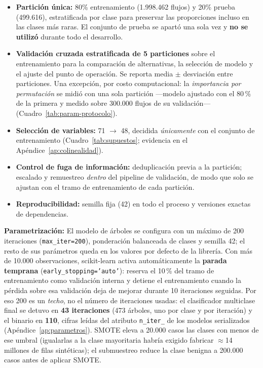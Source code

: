 \documentclass[11pt,a4paper]{article}
\begin{document}
\begin{itemize}
\item \textbf{Partición única:} 80\% entrenamiento (1.998.462 flujos) y 20\%
prueba (499.616), estratificada por clase para preservar las proporciones
incluso en las clases más raras. El conjunto de prueba se apartó una sola vez
y \textbf{no se utilizó} durante todo el desarrollo.
\item \textbf{Validación cruzada estratificada de 5 particiones} sobre el
entrenamiento para la comparación de alternativas, la selección de modelo y
el ajuste del punto de operación. Se reporta media $\pm$ desviación entre
particiones. Una excepción, por costo computacional: la \emph{importancia por
permutación} se midió con una sola partición ---modelo ajustado con el
80\,\% de la primera y medido sobre 300.000 flujos de su validación---
(Cuadro~\ref{tab:param-protocolo}).
\item \textbf{Selección de variables:} 71 $\rightarrow$ 48, decidida
\emph{únicamente} con el conjunto de entrenamiento (Cuadro~\ref{tab:supuestos}; evidencia en el Apéndice~\ref{ap:colinealidad}).
\item \textbf{Control de fuga de información:} deduplicación previa a la
partición; escalado y remuestreo \emph{dentro} del pipeline de validación, de
modo que solo se ajustan con el tramo de entrenamiento de cada partición.
\item \textbf{Reproducibilidad:} semilla fija (42) en todo el proceso y
versiones exactas de dependencias.
\end{itemize}

\noindent\textbf{Parametrización:} El modelo de árboles se configura con un
máximo de 200 iteraciones (\texttt{max\_iter=200}), ponderación balanceada de
clases y semilla 42; el resto de sus parámetros queda en los valores por
defecto de la librería. Con más de 10.000 observaciones, scikit-learn activa
automáticamente la \textbf{parada temprana} (\texttt{early\_stopping='auto'}):
reserva el 10\,\% del tramo de entrenamiento como validación interna y detiene
el entrenamiento cuando la pérdida sobre esa validación deja de mejorar
durante 10 iteraciones seguidas. Por eso 200 es un \emph{techo}, no el número
de iteraciones usadas: el clasificador multiclase final se detuvo en
\textbf{43 iteraciones} (473 árboles, uno por clase y por iteración) y el
binario en \textbf{110}, cifras leídas del atributo \texttt{n\_iter\_} de los
modelos serializados (Apéndice~\ref{ap:parametros}). SMOTE eleva a 20.000
casos las clases con menos de ese umbral (igualarlas a la clase mayoritaria
habría exigido fabricar $\approx$14 millones de filas sintéticas); el
submuestreo reduce la clase benigna a 200.000 casos antes de aplicar SMOTE.
\end{document}
